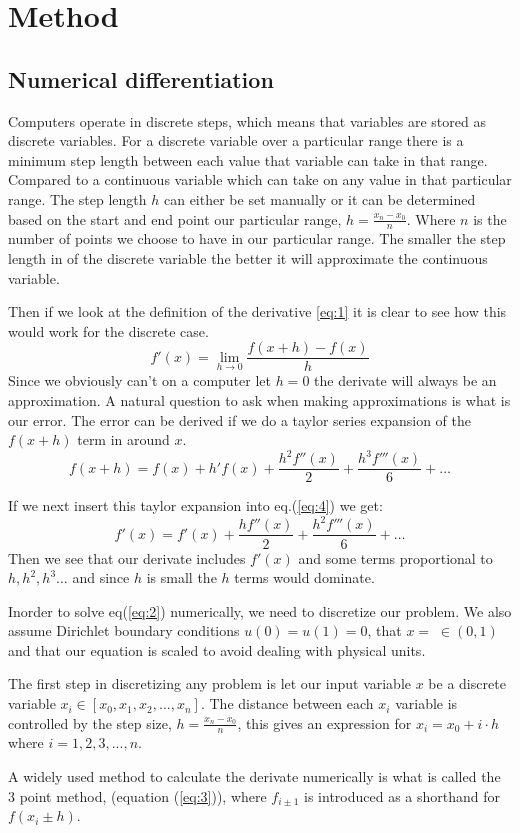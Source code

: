 \section*{Method}
\subsection*{Numerical differentiation}
\par Computers operate in discrete steps, which means that variables are stored as discrete variables. For a discrete variable over a particular range there is a minimum step length between each value that variable can take in that range. Compared to a continuous variable which can take on any value in that particular range. The step length $h$ can either be set manually or it can be determined based on the start and end point our particular range, $h = \frac{x_n -x_0}{n}$. Where $n$ is the number of points we choose to have in our particular range. The smaller the step length in of the discrete variable the better it will approximate the continuous variable.  
\par
Then if we look at the definition of the derivative \ref{eq:1} it is clear to see how this would work for the discrete case.    
\begin{equation}\label{eq:1}
    f'(x) = \lim_{h\to 0} \frac{f(x+h)-f(x)}{h}
\end{equation}\label{eq:1} 
Since we obviously can't on a computer let $h = 0$ the derivate will always be an approximation. A natural question to ask when making approximations is what is our error. The error can be derived if we do a taylor series expansion of the $f(x+h)$ term in around $x$.
\begin{equation}\label{eq:4}
    f(x+h) = f(x) + h'f(x) + \frac{h^2f''(x)}{2} + \frac{h^3f'''(x)}{6} + \dots    
\end{equation}   

If we next insert this taylor expansion into eq.(\ref{eq:4}) we get:
\begin{equation}
  f'(x) = f'(x) + \frac{h f''(x)}{2} + \frac{h^2f'''(x)}{6} + \dots
\end{equation} 
Then we see that our derivate includes $f'(x)$ and some terms proportional to $h, h^2, h^3 \dots $ and since $h$ is small the $h$ terms would dominate.   
\par
Inorder to solve eq(\ref{eq:2}) numerically, we need to discretize our problem. We also assume Dirichlet boundary conditions $u(0) = u(1) = 0$, that $x = \; \in (0,1)$ and that our equation is scaled to avoid dealing with physical units. \par The first step in discretizing any problem is let our input variable $x$ be a discrete variable $x_i \in \left[x_0, x_1, x_2, ..., x_n \right]$. The distance between each $x_i$ variable is controlled by the step size, $h = \frac{x_n -x_0}{n}$, this gives an expression for $x_i = x_0 + i\cdot h$ where $i = 1,2,3, ..., n$. 
\par A widely used method to calculate the derivate numerically is what is called the 3 point method, (equation (\ref{eq:3})), where $f_{i \pm 1}$ is introduced as a shorthand for $ f(x_i \pm h)$.   

